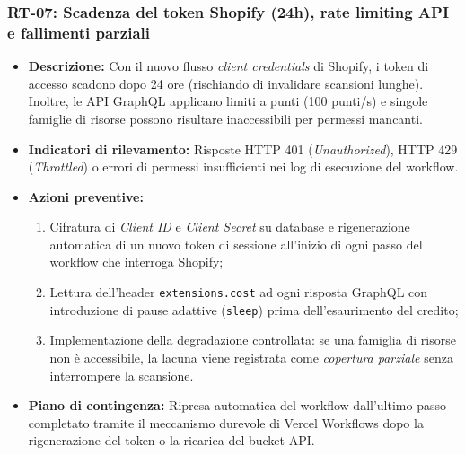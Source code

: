 \subsubsection{RT-07: Scadenza del token Shopify (24h), rate limiting API e fallimenti parziali}
\begin{itemize}
    \item \textbf{Descrizione:} Con il nuovo flusso \textit{client credentials} di Shopify, i token di accesso scadono dopo 24 ore (rischiando di invalidare scansioni lunghe). Inoltre, le API GraphQL applicano limiti a punti (100 punti/s) e singole famiglie di risorse possono risultare inaccessibili per permessi mancanti.
    \item \textbf{Indicatori di rilevamento:} Risposte HTTP 401 (\textit{Unauthorized}), HTTP 429 (\textit{Throttled}) o errori di permessi insufficienti nei log di esecuzione del workflow.
    \item \textbf{Azioni preventive:}
    \begin{enumerate}
        \item Cifratura di \textit{Client ID} e \textit{Client Secret} su database e rigenerazione automatica di un nuovo token di sessione all'inizio di ogni passo del workflow che interroga Shopify;
        \item Lettura dell'header \texttt{extensions.cost} ad ogni risposta GraphQL con introduzione di pause adattive (\texttt{sleep}) prima dell'esaurimento del credito;
        \item Implementazione della degradazione controllata: se una famiglia di risorse non è accessibile, la lacuna viene registrata come \textit{copertura parziale} senza interrompere la scansione.
    \end{enumerate}
    \item \textbf{Piano di contingenza:} Ripresa automatica del workflow dall'ultimo passo completato tramite il meccanismo durevole di Vercel Workflows dopo la rigenerazione del token o la ricarica del bucket API.
\end{itemize}

